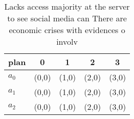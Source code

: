 \documentclass[a4paper]{article}
\begin{document}
\begin{table}
\begin{adjustbox}{width=0.9\columnwidth}
\begin{tabular}{|l|l|l|l|l|}
\hline
\textbf{plan} & \multicolumn{1}{c|}{\textbf{0}} & \multicolumn{1}{c|}{\textbf{1}} & \multicolumn{1}{c|}{\textbf{2}} & \multicolumn{1}{c|}{\textbf{3}} \\ \hline
\textbf{$a_0$}  & (0,0) & (1,0) & (2,0) & (3,0) \\ \hline
\textbf{$a_1$}  & (0,0) & (1,0) & (2,0) & (3,0) \\ \hline
\textbf{$a_2$}  & (0,0) & (1,0) & (2,0) & (3,0) \\ \hline
\end{tabular}
\end{adjustbox}
\caption{Lacks access majority at the server to see social media can There are economic crises with evidences o involv
}
\end{table}
\end{document}
